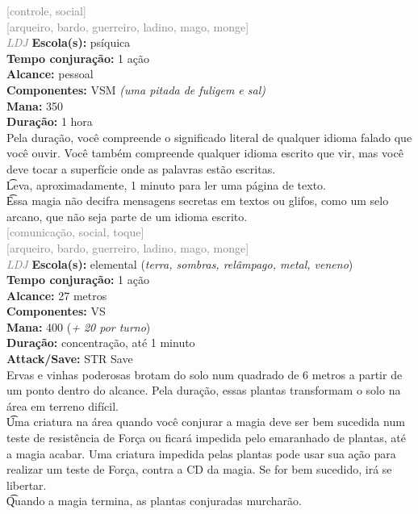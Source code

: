 \documentclass{RPG_Adventure}[2021/10/20]
\begin{document}
{\scriptsize \textcolor{gray}{[controle, social]\\}}
{\scriptsize \textcolor{gray}{[arqueiro, bardo, guerreiro, ladino, mago, monge]\\}}
{\tiny \textcolor{gray}{\textit{LDJ}}}
{\small \t \textbf{Escola(s):} psíquica\\\t \textbf{Tempo conjuração:} 1 ação\\\t \textbf{Alcance:} pessoal\\\t \textbf{Componentes:} VSM \textit{(uma pitada de fuligem e sal)}\\\t \textbf{Mana:} 350\\\t \textbf{Duração:} 1 hora\\}
{\normalsize Pela duração, você compreende o significado literal de qualquer idioma falado que você ouvir. Você também compreende qualquer idioma escrito que vir, mas você deve tocar a superfície onde as palavras estão escritas.\\\t Leva, aproximadamente, 1 minuto para ler uma página de texto.\\\t Essa magia não decifra mensagens secretas em textos ou glifos, como um selo arcano, que não seja parte de um idioma escrito.\\}
{\scriptsize \textcolor{gray}{[comunicação, social, toque]\\}}
{\scriptsize \textcolor{gray}{[arqueiro, bardo, guerreiro, ladino, mago, monge]\\}}
{\tiny \textcolor{gray}{\textit{LDJ}}}
{\small \t \textbf{Escola(s):} elemental (\textit{terra, sombras, relâmpago, metal, veneno})\\\t \textbf{Tempo conjuração:} 1 ação\\\t \textbf{Alcance:} 27 metros\\\t \textbf{Componentes:} VS\\\t \textbf{Mana:} 400 (\textit{+ 20 por turno})\\\t \textbf{Duração:} concentração, até 1 minuto\\\t \textbf{Attack/Save:} STR Save\\}
{\normalsize Ervas e vinhas poderosas brotam do solo num quadrado de 6 metros a partir de um ponto dentro do alcance. Pela duração, essas plantas transformam o solo na área em terreno difícil.\\\t Uma criatura na área quando você conjurar a magia deve ser bem sucedida num teste de resistência de Força ou ficará impedida pelo emaranhado de plantas, até a magia acabar. Uma criatura impedida pelas plantas pode usar sua ação para realizar um teste de Força, contra a CD da magia. Se for bem sucedido, irá se libertar.\\\t Quando a magia termina, as plantas conjuradas murcharão.\\}
\end{document}
